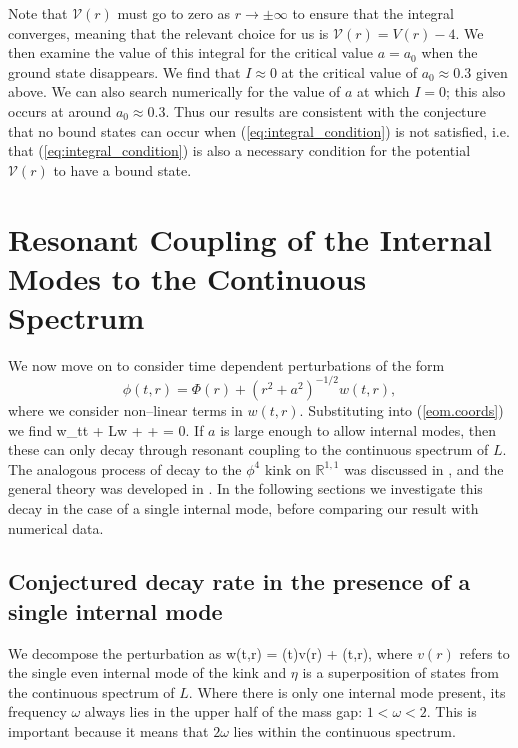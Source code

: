 Note that $\mathcal{V}(r)$ must go to zero as $r\rightarrow\pm\infty$ to ensure that the integral converges, meaning that the relevant choice for us is $\mathcal{V}(r)=V(r)-4$. We then examine the value of this integral for the critical value $a=a_0$ when the ground state disappears. We find that $I\approx0$ at the critical value of $a_0 \approx 0.3$ given above. We can also search numerically for the value of $a$ at which $I=0$; this also occurs at around $a_0 \approx 0.3$. Thus our results are consistent with the conjecture that no bound states can occur when (\ref{eq:integral_condition}) is not satisfied, i.e. that (\ref{eq:integral_condition}) is also a necessary condition for the potential $\mathcal{V}(r)$ to have a bound state.

\section{Resonant Coupling of the Internal Modes to the Continuous Spectrum} \label{sec:dynamics}
We now move on to consider time dependent perturbations of the form
\[
\phi(t,r) = \Phi(r) + (r^2+a^2)^{-1/2}w(t,r),
\]
where we consider non--linear terms in $w(t,r)$. Substituting into (\ref{eom.coords}) we find
\be
\label{eq:nonsmall_pert}
w_{tt} + Lw +  +  = 0.
\ee
If $a$ is large enough to allow internal modes, then these can only decay through resonant coupling to the continuous spectrum of $L$. The analogous process of decay to the $\phi^4$ kink on $\mathbb{R}^{1,1}$ was discussed in \cite{Manton&Merabet}, and the general theory was developed in \cite{SW98}. In the following sections we investigate this decay in the case of a single internal mode, before comparing our result with numerical data.

\subsection{Conjectured decay rate in the presence of a single internal mode} \label{sec:conjecture}
We decompose the perturbation as
\be
w(t,r) = \alpha(t)v(r) + \eta(t,r),
\ee
where $v(r)$ refers to the single even internal mode of the kink and $\eta$ is a superposition of states from the continuous spectrum of $L$. Where there is only one internal mode present, its frequency $\omega$ always lies in the upper half of the mass gap: $1<\omega<2$. This is important because it means that $2\omega$ lies within the continuous spectrum.

